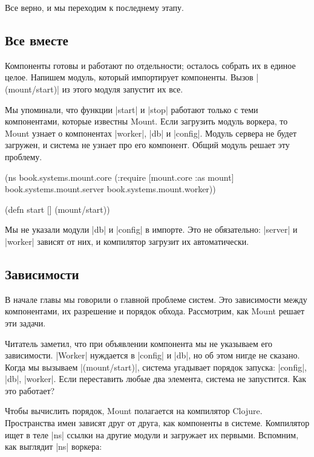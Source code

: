 Все верно, и мы переходим к последнему этапу.

\subsection{Все вместе}

Компоненты готовы и работают по отдельности; осталось собрать их в единое
целое. Напишем модуль, который импортирует компоненты. Вызов
\spverb|(mount/start)| из этого модуля запустит их все.

Мы упоминали, что функции \spverb|start| и \spverb|stop| работают только с теми
компонентами, которые известны Mount. Если загрузить модуль воркера, то
Mount узнает о компонентах \spverb|worker|, \spverb|db| и
\spverb|config|. Модуль сервера не будет загружен, и система не узнает про его
компонент. Общий модуль решает эту проблему.

\begin{english}
  \begin{clojure}
(ns book.systems.mount.core
  (:require
   [mount.core :as mount]
   book.systems.mount.server
   book.systems.mount.worker))

(defn start []
  (mount/start))
  \end{clojure}
\end{english}

Мы не указали модули \spverb|db| и \spverb|config| в импорте. Это не
обязательно: \spverb|server| и \spverb|worker| зависят от них, и компилятор
загрузит их автоматически.

\subsection{Зависимости}

В начале главы мы говорили о главной проблеме систем. Это зависимости между
компонентами, их разрешение и порядок обхода. Рассмотрим, как Mount
решает эти задачи.

Читатель заметил, что при объявлении компонента мы не указываем его
зависимости. \spverb|Worker| нуждается в \spverb|config| и \spverb|db|, но об
этом нигде не сказано. Когда мы вызываем \spverb|(mount/start)|, система
угадывает порядок запуска: \spverb|config|, \spverb|db|, \spverb|worker|. Если
переставить любые два элемента, система не запустится. Как это работает?

Чтобы вычислить порядок, Mount полагается на компилятор
Clojure. Пространства имен зависят друг от друга, как компоненты в
системе. Компилятор ищет в теле \spverb|ns| ссылки на другие модули и загружает
их первыми. Вспомним, как выглядит \spverb|ns| воркера:


